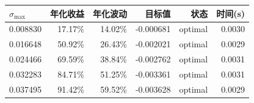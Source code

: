 \begin{center}
\small
\begin{tabular}{lrrrrr}
\toprule
$\sigma_{\max}$ & 年化收益 & 年化波动 & 目标值 & 状态 & 时间(s) \\
\midrule
0.008830 & 17.17\% & 14.02\% & -0.000681 & optimal & 0.0030 \\
0.016648 & 50.92\% & 26.43\% & -0.002021 & optimal & 0.0029 \\
0.024466 & 69.59\% & 38.84\% & -0.002762 & optimal & 0.0031 \\
0.032283 & 84.71\% & 51.25\% & -0.003361 & optimal & 0.0031 \\
0.037495 & 91.42\% & 59.52\% & -0.003628 & optimal & 0.0029 \\
\bottomrule
\end{tabular}
\end{center}